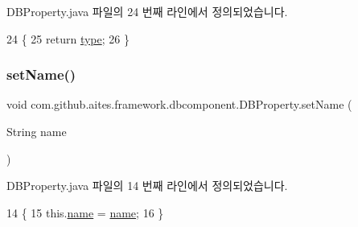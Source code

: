 D\+B\+Property.\+java 파일의 24 번째 라인에서 정의되었습니다.


\begin{DoxyCode}
24                                \{
25             \textcolor{keywordflow}{return} \mbox{\hyperlink{classcom_1_1github_1_1aites_1_1framework_1_1dbcomponent_1_1_d_b_property_aee1abc4b687abc96bedf9b19d1f52a95}{type}};
26         \}
\end{DoxyCode}
\mbox{\label{classcom_1_1github_1_1aites_1_1framework_1_1dbcomponent_1_1_d_b_property_ae2b3c66918c5890437b3d723094ce60b}} 
\subsubsection{\texorpdfstring{set\+Name()}{setName()}}
{\footnotesize\ttfamily void com.\+github.\+aites.\+framework.\+dbcomponent.\+D\+B\+Property.\+set\+Name (\begin{DoxyParamCaption}\item[{String}]{name }\end{DoxyParamCaption})}



D\+B\+Property.\+java 파일의 14 번째 라인에서 정의되었습니다.


\begin{DoxyCode}
14                                         \{
15             this.\mbox{\hyperlink{classcom_1_1github_1_1aites_1_1framework_1_1dbcomponent_1_1_d_b_property_ada4967ef698663a6b4d30402e6945702}{name}} = \mbox{\hyperlink{classcom_1_1github_1_1aites_1_1framework_1_1dbcomponent_1_1_d_b_property_ada4967ef698663a6b4d30402e6945702}{name}};
16         \}
\end{DoxyCode}
\mbox{\label{classcom_1_1github_1_1aites_1_1framework_1_1dbcomponent_1_1_d_b_property_a8ac9e10400c059b319cef19c8f37d95d}} 
